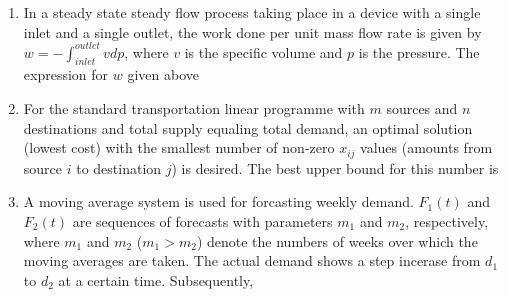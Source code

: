 \documentclass[journal,12pt,onecolumn]{IEEEtran}
\begin{document}
\begin{enumerate}
    \item In a steady state steady flow process taking place in a device with a single inlet and a single outlet, the work done per unit mass flow rate is given by $w=-\int_{inlet}^{outlet} vdp$, where $v$ is the specific volume and $p$ is the pressure. The expression for $w$ given above\\

          \begin{enumerate}
          \end{enumerate}

    \item For the standard transportation linear programme with $m$ sources and $n$ destinations and total supply equaling total demand, an optimal solution (lowest cost) with the smallest number of non-zero $x_{ij}$ values (amounts from source $i$ to destination $j$) is desired. The best upper bound for this number is\\

          \begin{enumerate}
          \end{enumerate}

    \item A moving average system is used for forcasting weekly demand. $F_1(t)$ and $F_2(t)$ are sequences of forecasts with parameters $m_1$ and $m_2$, respectively, where $m_1$ and $m_2$ ($m_1>m_2$) denote the numbers of weeks over which the moving averages are taken. The actual demand shows a step incerase from $d_1$ to $d_2$ at a certain time. Subsequently,\\


\end{enumerate}
\end{document}
